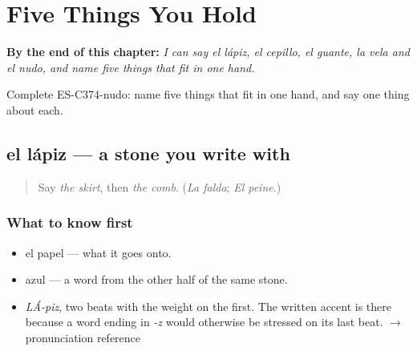 
\chapter{Five Things You Hold}
\label{ch:el-lapiz-y-el-cepillo}

\begin{chapteropening}
\textbf{By the end of this chapter:} \emph{I can say el lápiz, el cepillo, el guante, la vela and el nudo, and name five things that fit in one hand.}

Complete ES-C374-nudo: name five things that fit in one hand, and say one thing about each.
\end{chapteropening}

\section[el lápiz]{el lápiz — a stone you write with}

\label{lesson:ES-C374-lapiz}



\begin{quote}
Say \emph{the skirt}, then \emph{the comb}. (\emph{La falda}; \emph{El peine}.)
\end{quote}

\subsection*{What to know first}
\begin{itemize}
\raggedright
  \item el papel — what it goes onto.
  \item azul — a word from the other half of the same stone.
\end{itemize}

\begin{sounds}
\begin{itemize}
\raggedright
  \item \emph{LÁ-piz}, two beats with the weight on the first. The written accent is there because a word ending in \emph{-z} would otherwise be stressed on its last beat. $\to$ pronunciation reference
\end{itemize}
\end{sounds}

